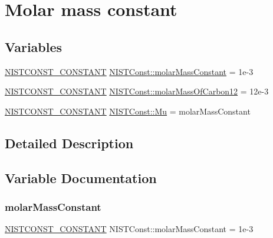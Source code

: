 \hypertarget{group___n_i_s_t_const-_molar_mass_constant}{}\section{Molar mass constant}
\label{group___n_i_s_t_const-_molar_mass_constant}
\subsection*{Variables}
\begin{DoxyCompactItemize}
\item 
\mbox{\hyperlink{group___n_i_s_t_const-_macros_ga2b0fc1d7452373f816175dd86ce26729}{N\+I\+S\+T\+C\+O\+N\+S\+T\+\_\+\+C\+O\+N\+S\+T\+A\+NT}} \mbox{\hyperlink{group___n_i_s_t_const-_molar_mass_constant_gaf82ba48d26910f7aead29d2390058327}{N\+I\+S\+T\+Const\+::molar\+Mass\+Constant}} = 1e-\/3
\item 
\mbox{\hyperlink{group___n_i_s_t_const-_macros_ga2b0fc1d7452373f816175dd86ce26729}{N\+I\+S\+T\+C\+O\+N\+S\+T\+\_\+\+C\+O\+N\+S\+T\+A\+NT}} \mbox{\hyperlink{group___n_i_s_t_const-_molar_mass_constant_gad9065879bcb5df86d887c5c547b7ab17}{N\+I\+S\+T\+Const\+::molar\+Mass\+Of\+Carbon12}} = 12e-\/3
\item 
\mbox{\hyperlink{group___n_i_s_t_const-_macros_ga2b0fc1d7452373f816175dd86ce26729}{N\+I\+S\+T\+C\+O\+N\+S\+T\+\_\+\+C\+O\+N\+S\+T\+A\+NT}} \mbox{\hyperlink{group___n_i_s_t_const-_molar_mass_constant_gaa02db2096b35ba17b364c95c59d4b800}{N\+I\+S\+T\+Const\+::\+Mu}} = molar\+Mass\+Constant
\end{DoxyCompactItemize}


\subsection{Detailed Description}


\subsection{Variable Documentation}
\mbox{\label{group___n_i_s_t_const-_molar_mass_constant_gaf82ba48d26910f7aead29d2390058327}} 
\subsubsection{\texorpdfstring{molar\+Mass\+Constant}{molarMassConstant}}
{\footnotesize\ttfamily \mbox{\hyperlink{group___n_i_s_t_const-_macros_ga2b0fc1d7452373f816175dd86ce26729}{N\+I\+S\+T\+C\+O\+N\+S\+T\+\_\+\+C\+O\+N\+S\+T\+A\+NT}} N\+I\+S\+T\+Const\+::molar\+Mass\+Constant = 1e-\/3}

